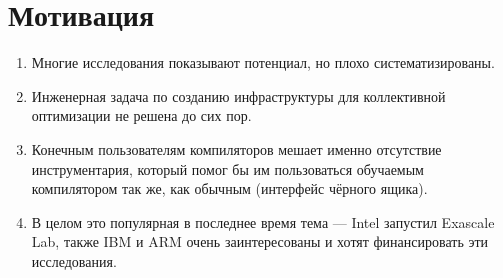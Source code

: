 \section{Мотивация}
\begin{enumerate}
\item Многие исследования показывают потенциал, но плохо систематизированы.
\item Инженерная задача по созданию инфраструктуры для коллективной оптимизации не решена до сих пор.
\item Конечным пользователям компиляторов мешает именно отсутствие инструментария, который помог бы им пользоваться обучаемым компилятором так же, как обычным (интерфейс чёрного ящика).
\item В целом это популярная в последнее время тема — Intel запустил Exascale Lab, также IBM и ARM очень заинтересованы и хотят финансировать эти исследования.
\end{enumerate}

